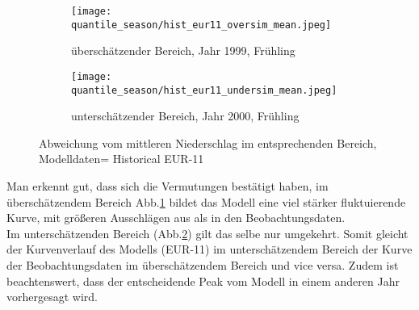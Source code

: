 \begin{figure}[h]
	\begin{subfigure}{0.49\textwidth}
		\texttt{[image: quantile\_season/hist\_eur11\_oversim\_mean.jpeg]}
		\caption{überschätzender Bereich, Jahr 1999, Frühling}
		\label{fig:seasons:hist_eur11:oversim_mean}
	\end{subfigure}
	\begin{subfigure}{0.49\textwidth}
		\texttt{[image: quantile\_season/hist\_eur11\_undersim\_mean.jpeg]}
		\caption{unterschätzender Bereich, Jahr 2000, Frühling}
		\label{fig:seasons:hist_eur11:undersim_mean}
	\end{subfigure}
	\caption{Abweichung vom mittleren Niederschlag im entsprechenden Bereich, Modelldaten= Historical EUR-11}
	\label{fig:seasons:hist_eur11:overundersim_mean}
\end{figure}
Man erkennt gut, dass sich die Vermutungen bestätigt haben, im überschätzendem Bereich Abb.\ref{fig:seasons:hist_eur11:oversim_mean} bildet das Modell eine viel stärker fluktuierende Kurve, mit größeren Ausschlägen aus als in den Beobachtungsdaten.\\
Im unterschätzenden Bereich (Abb.\ref{fig:seasons:hist_eur11:undersim_mean}) gilt das selbe nur umgekehrt. Somit gleicht der Kurvenverlauf des Modells (EUR-11) im unterschätzendem Bereich der Kurve der Beobachtungsdaten im überschätzendem Bereich und vice versa. Zudem ist beachtenswert, dass der entscheidende Peak vom Modell in einem anderen Jahr vorhergesagt wird.\\

